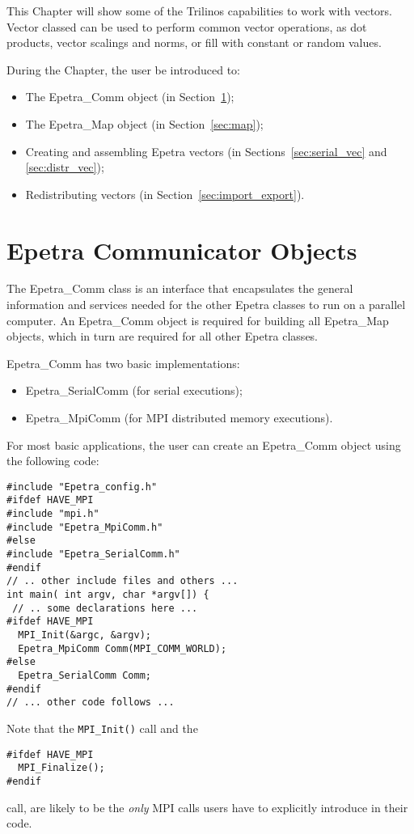 \medskip

This Chapter will show some of the Trilinos capabilities to work with
vectors. Vector classed can be used to perform common vector operations,
as dot products, vector scalings and norms, or fill with constant or
random values. 

\medskip

During the Chapter, the user be introduced to:
\begin{itemize}
\item The Epetra\_Comm object (in Section~\ref{sec:comm});
\item The Epetra\_Map object (in Section~\ref{sec:map});
\item Creating and assembling Epetra vectors (in
  Sections~\ref{sec:serial_vec} and \ref{sec:distr_vec});
\item Redistributing vectors (in Section~\ref{sec:import_export}).
\end{itemize}


\section{Epetra Communicator Objects}
\label{sec:comm}

The Epetra\_Comm class is an interface that encapsulates the general
information and services needed for the other Epetra classes to run on a
parallel computer. An Epetra\_Comm object is required for building all
Epetra\_Map objects, which in turn are required for all other Epetra
classes.

Epetra\_Comm has two basic implementations:
\begin{itemize}
\item Epetra\_SerialComm (for serial executions);
\item Epetra\_MpiComm (for MPI distributed memory executions).
\end{itemize}

For most basic applications, the user can create an Epetra\_Comm object
using the following code:
\begin{verbatim}
#include "Epetra_config.h"
#ifdef HAVE_MPI
#include "mpi.h"
#include "Epetra_MpiComm.h"
#else
#include "Epetra_SerialComm.h"
#endif
// .. other include files and others ...
int main( int argv, char *argv[]) {
 // .. some declarations here ...
#ifdef HAVE_MPI
  MPI_Init(&argc, &argv);
  Epetra_MpiComm Comm(MPI_COMM_WORLD);
#else
  Epetra_SerialComm Comm;
#endif
// ... other code follows ...
\end{verbatim}
Note that the \verb!MPI_Init()! call and the
\begin{verbatim}
#ifdef HAVE_MPI
  MPI_Finalize();
#endif
\end{verbatim}
call, are likely to be the {\em only} MPI calls users have to explicitly
introduce in their code.

